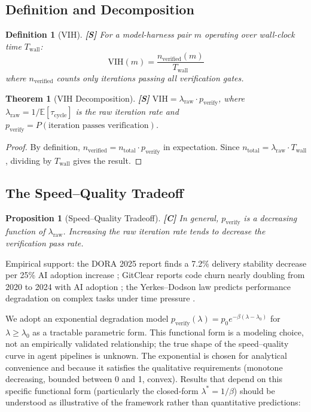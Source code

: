\documentclass[11pt, a4paper, copyright]{googledeepmind}
\newtheorem{definition}{Definition}[section]
\newtheorem{theorem}{Theorem}[section]
\newtheorem{proposition}{Proposition}[section]
\newcommand{\VIH}{\mathrm{VIH}}
\newcommand{\E}{\mathbb{E}}
\begin{document}
\subsection{Definition and Decomposition}

\begin{definition}[VIH]\label{def:vih}
\textbf{[S]} For a model-harness pair $m$ operating over wall-clock time $T_{\mathrm{wall}}$:
\[
    \VIH(m) = \frac{n_{\mathrm{verified}}(m)}{T_{\mathrm{wall}}}
\]
where $n_{\mathrm{verified}}$ counts only iterations passing all verification gates.
\end{definition}

\begin{theorem}[VIH Decomposition]\label{thm:vih-decomp}
\textbf{[S]} $\VIH = \lambda_{\mathrm{raw}} \cdot p_{\mathrm{verify}}$, where $\lambda_{\mathrm{raw}} = 1/\E[\tau_{\mathrm{cycle}}]$ is the raw iteration rate and $p_{\mathrm{verify}} = P(\text{iteration passes verification})$.
\end{theorem}

\begin{proof}
By definition, $n_{\mathrm{verified}} = n_{\mathrm{total}} \cdot p_{\mathrm{verify}}$ in expectation. Since $n_{\mathrm{total}} = \lambda_{\mathrm{raw}} \cdot T_{\mathrm{wall}}$, dividing by $T_{\mathrm{wall}}$ gives the result.
\end{proof}

\subsection{The Speed--Quality Tradeoff}

\begin{proposition}[Speed--Quality Tradeoff]\label{prop:tradeoff}
\textbf{[C]} In general, $p_{\mathrm{verify}}$ is a decreasing function of $\lambda_{\mathrm{raw}}$. Increasing the raw iteration rate tends to decrease the verification pass rate.
\end{proposition}

Empirical support: the DORA 2025 report finds a 7.2\% delivery stability decrease per 25\% AI adoption increase \citep{dora2025}; GitClear reports code churn nearly doubling from 2020 to 2024 with AI adoption \citep{gitclear2025}; the Yerkes--Dodson law predicts performance degradation on complex tasks under time pressure \citep{yerkes1908relation}.

We adopt an exponential degradation model $p_{\mathrm{verify}}(\lambda) = p_0 e^{-\beta(\lambda - \lambda_0)}$ for $\lambda \geq \lambda_0$ as a tractable parametric form. This functional form is a modeling choice, not an empirically validated relationship; the true shape of the speed--quality curve in agent pipelines is unknown. The exponential is chosen for analytical convenience and because it satisfies the qualitative requirements (monotone decreasing, bounded between 0 and 1, convex). Results that depend on this specific functional form (particularly the closed-form $\lambda^* = 1/\beta$) should be understood as illustrative of the framework rather than quantitative predictions:
\end{document}
